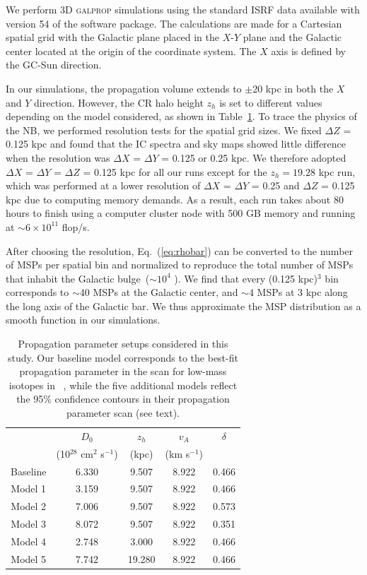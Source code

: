 \documentclass[doublespace,nopageskip]{VTthesis} %
\begin{document}
We perform 3D \textsc{galprop} simulations using the standard ISRF data available with version 54 of the software package. The calculations are made for a Cartesian spatial grid with the Galactic plane placed in the $X$-$Y$ plane and the Galactic center located at the origin of the coordinate system. The $X$ axis is defined by the GC-Sun direction.

In our simulations, the propagation volume extends to $\pm$20 kpc in both the $X$ and $Y$ direction. However, the CR halo height $z_h$ is set to different values depending on the model considered, as shown in Table~\ref{tab:dpara}. To trace the physics of the NB, we performed resolution tests for the spatial grid sizes. We fixed $\Delta Z$ = 0.125 kpc and found that the IC spectra and sky maps showed little difference when the resolution was $\Delta X$ = $\Delta Y$ = 0.125 or 0.25 kpc. We therefore adopted $\Delta X$ = $\Delta Y$ = $\Delta Z$ = 0.125 kpc for all our runs except for the $z_h = 19.28$ kpc run, which was performed at a lower resolution of $\Delta X$ = $\Delta Y$ = 0.25 and $\Delta Z$ = 0.125 kpc due to computing memory demands. As a result, each run takes about 80 hours to finish using a computer cluster node with 500 GB memory and running at $\sim 6 \times 10^{11}$ flop/s.

After choosing the resolution, Eq.~(\ref{eq:rhobar}) can be converted to the number of MSPs per spatial bin and normalized to reproduce the total number of MSPs that inhabit the Galactic bulge~($\sim 10^4$ \cite{2018ApJ...863..199G}). We find that every (0.125 kpc)$^3$ bin corresponds to $\sim 40$ MSPs at the Galactic center, and $\sim 4$ MSPs at 3 kpc along the long axis of the Galactic bar. We thus approximate the MSP distribution as a smooth function in our simulations.

\begin{table}[htb]
  \centering
  \caption{Propagation parameter setups considered in this study. Our baseline model corresponds to the best-fit propagation parameter in the scan for low-mass isotopes in ~\citet{2016ApJ...824...16J}, while the five additional models reflect the 95\% confidence contours in their propagation parameter scan \cite{2016ApJ...824...16J} (see text).}
    \begin{tabular}{ c c c c c }
    \toprule
      & $D_0$ & $z_h$ & $v_A$  &$\delta$ \\
      & (10$^{28}$ cm$^2$ s$^{-1}$) & (kpc) & (km s$^{-1}$) & \\ 
      \midrule
      Baseline & 6.330 & 9.507 & 8.922 & 0.466 \\
      Model 1 & 3.159 & 9.507 & 8.922 & 0.466 \\
      Model 2 & 7.006 & 9.507 & 8.922 & 0.573 \\
      Model 3 & 8.072 & 9.507 & 8.922 & 0.351 \\
      Model 4 & 2.748 & 3.000 & 8.922 & 0.466 \\
      Model 5 & 7.742 & 19.280 & 8.922 & 0.466 \\
      \bottomrule
    \end{tabular}
\label{tab:dpara}
\end{table}
\end{document}
